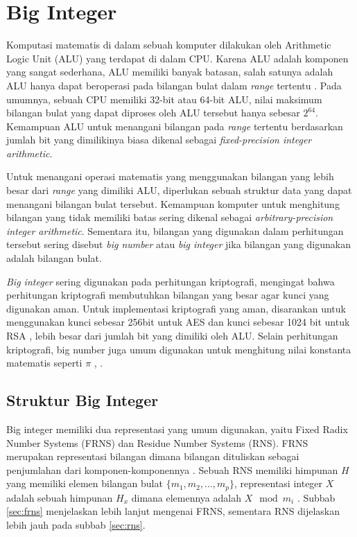 \section{Big Integer}
Komputasi matematis di dalam sebuah komputer dilakukan oleh Arithmetic Logic Unit (ALU) yang terdapat di dalam CPU. Karena ALU adalah komponen yang sangat sederhana, ALU memiliki banyak batasan, salah satunya adalah ALU hanya dapat beroperasi pada bilangan bulat dalam \textit{range} tertentu \citep{comp_org_arch}. Pada umumnya, sebuah CPU memiliki 32-bit atau 64-bit ALU, nilai maksimum bilangan bulat yang dapat diproses oleh ALU tersebut hanya sebesar $2^{64}$. Kemampuan ALU untuk menangani bilangan pada \textit{range} tertentu berdasarkan jumlah bit yang dimilikinya biasa dikenal sebagai \textit{fixed-precision integer arithmetic}.

Untuk menangani operasi matematis yang menggunakan bilangan yang lebih besar dari \textit{range} yang dimiliki ALU, diperlukan sebuah struktur data yang dapat menangani bilangan bulat tersebut. Kemampuan komputer untuk menghitung bilangan yang tidak memiliki batas sering dikenal sebagai \textit{arbitrary-precision integer arithmetic}. Sementara itu, bilangan yang digunakan dalam perhitungan tersebut sering disebut \textit{big number} atau \textit{big integer} jika bilangan yang digunakan adalah bilangan bulat.

\textit{Big integer} sering digunakan pada perhitungan kriptografi, mengingat bahwa perhitungan kriptografi membutuhkan bilangan yang besar agar kunci yang digunakan aman. Untuk implementasi kriptografi yang aman, disarankan untuk menggunakan kunci sebesar 256bit untuk AES dan kunci sebesar 1024 bit untuk RSA \citep{key_suggestion}, lebih besar dari jumlah bit yang dimiliki oleh ALU. Selain perhitungan kriptografi, big number juga umum digunakan untuk menghitung nilai konstanta matematis seperti $\pi$ \citep{bn_pi}, .
\subsection{Struktur Big Integer}

Big integer memiliki dua representasi yang umum digunakan, yaitu Fixed Radix Number Systems (FRNS) dan Residue Number Systems (RNS). FRNS merupakan representasi bilangan dimana bilangan dituliskan sebagai penjumlahan dari komponen-komponennya \citep{modern_comp_math}. Sebuah RNS memiliki himpunan $H$ yang memiliki elemen bilangan bulat $\{m_1,m_2,...,m_p\}$, representasi integer $X$ adalah sebuah himpunan $H_x$ dimana elemennya adalah $X \mod m_i$ \citep{rns_survey}. Subbab \ref{sec:frns} menjelaskan lebih lanjut mengenai FRNS, sementara RNS dijelaskan lebih jauh pada subbab \ref{sec:rns}.

